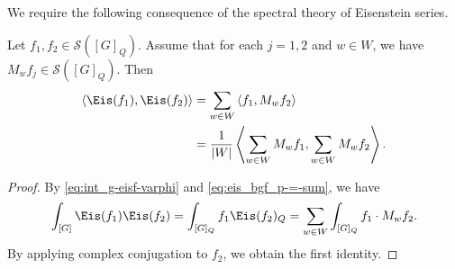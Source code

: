 We require the following consequence of the spectral theory of Eisenstein series.
\begin{proposition}\label{lem:let-f_1-f_2}
  Let $f_1, f_2 \in \mathcal{S}([G]_Q)$.  Assume that for each $j=1,2$ and $w \in W$, we have $M_w f_j \in \mathcal{S}([G]_Q)$.  Then
  \begin{align*}
    \left\langle \Eis(f_1), \Eis(f_2) \right\rangle
    &= \sum_{w \in W}
      \left\langle f_1, M_w f_2 \right\rangle \\
    &=
      \frac{1}{|W|}
      \left\langle \sum_{w \in W} M_w f_1, \sum_{w \in W } M_w f_2 \right\rangle.
  \end{align*}
\end{proposition}
\begin{proof}
  By \eqref{eq:int_g-eisf-varphi} and \eqref{eq:eis_bgf_p-=-sum}, we have
  \begin{equation*}
    \int_{[G]} \Eis(f_1) \Eis(f_2)
    =
    \int_{[G]_Q} f_1 \Eis(f_2)_Q
    = \sum_{w \in W}
    \int_{[G]_Q} f_1 \cdot  M_w f_2.
  \end{equation*}
  By applying complex conjugation to $f_2$, we obtain the first identity.


\end{proof}
